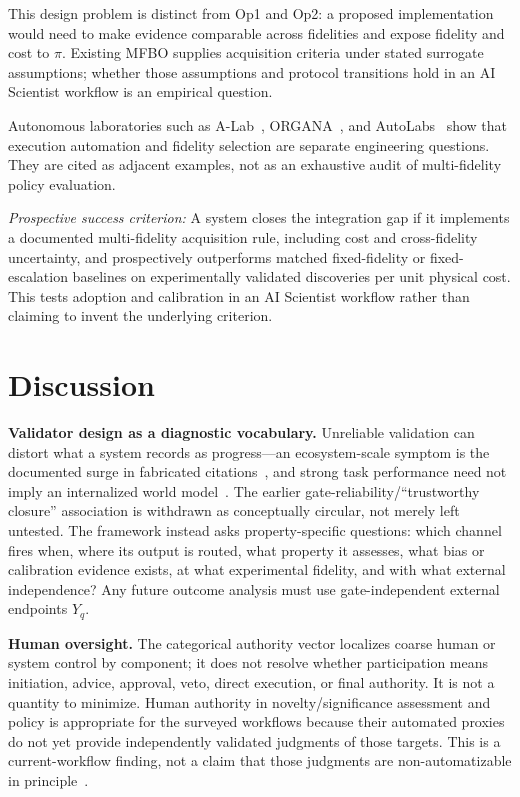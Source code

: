 \documentclass{article}
\begin{document}
This design problem is distinct from Op1 and Op2: a proposed implementation would need to make evidence comparable across fidelities and expose fidelity and cost to $\pi$. Existing MFBO supplies acquisition criteria under stated surrogate assumptions; whether those assumptions and protocol transitions hold in an AI Scientist workflow is an empirical question.

Autonomous laboratories such as A-Lab~\citep{szymanski2023alab}, ORGANA~\citep{darvish2024organa}, and AutoLabs~\citep{panapitiya2025autolabs} show that execution automation and fidelity selection are separate engineering questions. They are cited as adjacent examples, not as an exhaustive audit of multi-fidelity policy evaluation.

\textit{Prospective success criterion:} A system closes the integration gap if it implements a documented multi-fidelity acquisition rule, including cost and cross-fidelity uncertainty, and prospectively outperforms matched fixed-fidelity or fixed-escalation baselines on experimentally validated discoveries per unit physical cost. This tests adoption and calibration in an AI Scientist workflow rather than claiming to invent the underlying criterion.

\section{Discussion}
\label{sec:discussion}

\textbf{Validator design as a diagnostic vocabulary.} Unreliable validation can distort what a system records as progress---an ecosystem-scale symptom is the documented surge in fabricated citations~\citep{zhao2026hallucinations}, and strong task performance need not imply an internalized world model~\citep{vafa2025foundationmodel}. The earlier gate-reliability/``trustworthy closure'' association is withdrawn as conceptually circular, not merely left untested. The framework instead asks property-specific questions: which channel fires when, where its output is routed, what property it assesses, what bias or calibration evidence exists, at what experimental fidelity, and with what external independence? Any future outcome analysis must use gate-independent external endpoints $Y_q$.

\textbf{Human oversight.} The categorical authority vector localizes coarse human or system control by component; it does not resolve whether participation means initiation, advice, approval, veto, direct execution, or final authority. It is not a quantity to minimize. Human authority in novelty/significance assessment and policy is appropriate for the surveyed workflows because their automated proxies do not yet provide independently validated judgments of those targets. This is a current-workflow finding, not a claim that those judgments are non-automatizable in principle~\citep{parasuraman2000automation}.
\end{document}
